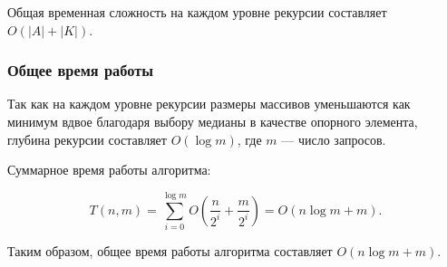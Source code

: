 \documentclass[11pt]{article}
\begin{document}
\begin{solution}
    Общая временная сложность на каждом уровне рекурсии составляет $O(|A| + |K|)$.

    \subsubsection*{Общее время работы}

    Так как на каждом уровне рекурсии размеры массивов уменьшаются как минимум вдвое благодаря выбору медианы в качестве опорного элемента, глубина рекурсии составляет $O(\log m)$, где $m$ — число запросов.

    Суммарное время работы алгоритма:

    \[
        T(n, m) = \sum_{i=0}^{\log m} O\left( \frac{n}{2^i} + \frac{m}{2^i} \right) = O(n \log m + m).
    \]

    Таким образом, общее время работы алгоритма составляет $O(n \log m + m)$.

\end{solution}
\end{document}

